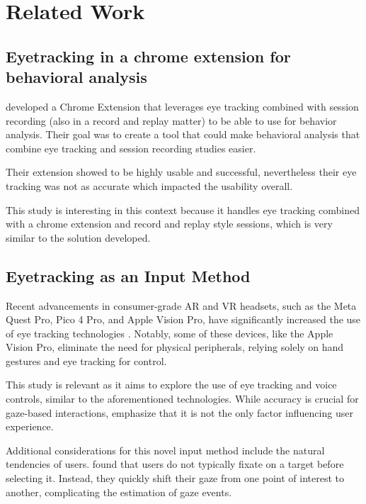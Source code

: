 \section{Related Work}

\subsection{Eyetracking in a chrome extension for behavioral analysis}

\cite{art:behavioral-analysis-2024} developed a Chrome Extension that leverages eye tracking combined with session recording (also in a record and replay matter) to be able to use for behavior analysis. Their goal was to create a tool that could make behavioral analysis that combine eye tracking and session recording studies easier.

Their extension showed to be highly usable and successful, nevertheless their eye tracking was not as accurate which impacted the usability overall.

This study is interesting in this context because it handles eye tracking combined with a chrome extension and record and replay style sessions, which is very similar to the solution developed.

\subsection{Eyetracking as an Input Method}

Recent advancements in consumer-grade AR and VR headsets, such as the Meta Quest Pro, Pico 4 Pro, and Apple Vision Pro, have significantly increased the use of eye tracking technologies \cite{art:avp-2024}. Notably, some of these devices, like the Apple Vision Pro, eliminate the need for physical peripherals, relying solely on hand gestures and eye tracking for control.

This study is relevant as it aims to explore the use of eye tracking and voice controls, similar to the aforementioned technologies. While accuracy is crucial for gaze-based interactions, \cite{art:avp-2024} emphasize that it is not the only factor influencing user experience.

Additional considerations for this novel input method include the natural tendencies of users. \cite{art:meta-studies-2023} found that users do not typically fixate on a target before selecting it. Instead, they quickly shift their gaze from one point of interest to another, complicating the estimation of gaze events.


